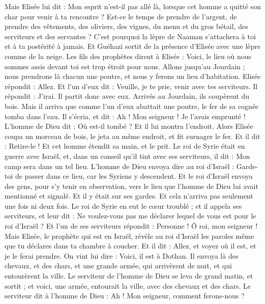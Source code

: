 \begin{multicols}{2}
Mais Elisée lui dit : Mon esprit n’est-il pas allé là, lorsque cet homme a quitté son char pour venir à ta rencontre ? Est-ce le temps de prendre de l’argent, de prendre des vêtements, des oliviers, des vignes, du menu et du gros bétail, des serviteurs et des servantes ?
C’est pourquoi la lèpre de Naaman s’attachera à toi et à ta postérité à jamais. Et Guéhazi sortit de la présence d’Elisée avec une lèpre comme de la neige.
\VerseOne{}Les fils des prophètes dirent à Elisée : Voici, le lieu où nous sommes assis devant toi est trop étroit pour nous.
Allons jusqu’au Jourdain ; nous prendrons là chacun une poutre, et nous y ferons un lieu d’habitation. Elisée répondit : Allez.
Et l’un d’eux dit : Veuille, je te prie, venir avec tes serviteurs. Il répondit : J’irai.
Il partit donc avec eux. Arrivés au Jourdain, ils coupèrent du bois.
Mais il arriva que comme l’un d’eux abattait une poutre, le fer de sa cognée tomba dans l’eau. Il s’écria, et dit : Ah ! Mon seigneur ! Je l’avais emprunté !
L’homme de Dieu dit : Où est-il tombé ? Et il lui montra l’endroit. Alors Elisée coupa un morceau de bois, le jeta au même endroit, et fit surnager le fer.
Et il dit : Retire-le ! Et cet homme étendit sa main, et le prit.
Le roi de Syrie était en guerre avec Israël, et, dans un conseil qu’il tint avec ses serviteurs, il dit : Mon camp sera dans un tel lieu.
L’homme de Dieu envoya dire au roi d’Israël : Garde-toi de passer dans ce lieu, car les Syriens y descendent.
Et le roi d’Israël envoya des gens, pour s’y tenir en observation, vers le lieu que l’homme de Dieu lui avait mentionné et signalé. Et il y était sur ses gardes. Et cela n’arriva pas seulement une fois ni deux fois.
Le roi de Syrie en eut le cœur troublé ; et il appela ses serviteurs, et leur dit : Ne voulez-vous pas me déclarer lequel de vous est pour le roi d’Israël ?
Et l’un de ses serviteurs répondit : Personne ! Ô roi, mon seigneur ! Mais Elisée, le prophète qui est en Israël, révèle au roi d’Israël les paroles même que tu déclares dans ta chambre à coucher.
Et il dit : Allez, et voyez où il est, et je le ferai prendre. On vint lui dire : Voici, il est à Dothan.
Il envoya là des chevaux, et des chars, et une grande armée, qui arrivèrent de nuit, et qui entourèrent la ville.
Le serviteur de l’homme de Dieu se leva de grand matin, et sortit ; et voici, une armée, entourait la ville, avec des chevaux et des chars. Le serviteur dit à l’homme de Dieu : Ah ! Mon seigneur, comment ferons-nous ?

\end{multicols}
